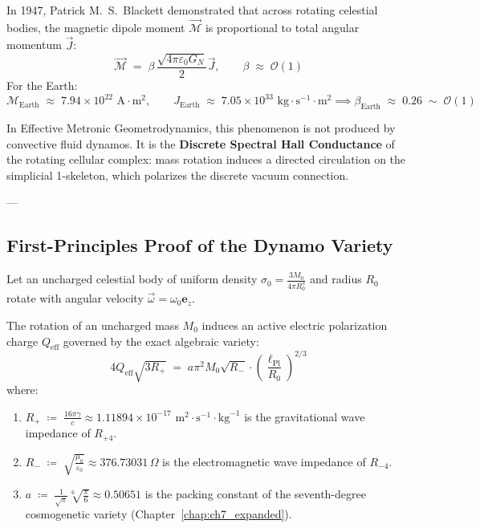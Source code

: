 \documentclass[
    12pt,
    a4paper,
    headings=normal,
    twoside=false,
    open=any,
    parskip=half
]{scrbook}
\begin{document}
In 1947, Patrick M.~S.~Blackett demonstrated that across rotating celestial bodies, the magnetic dipole moment $\vec{\mathcal{M}}$ is proportional to total angular momentum $\vec{J}$:
\begin{equation}
\vec{\mathcal{M}} \;=\; \beta \, \frac{\sqrt{4\pi\varepsilon_0 G_N}}{2} \vec{J}, \qquad \beta \;\approx\; \mathcal{O}(1)
\label{eq:ch6_blackett_empirical_scaling}
\end{equation}
For the Earth:
\begin{equation}
\mathcal{M}_{\text{Earth}} \;\approx\; 7.94 \times 10^{22} \text{ A}\cdot\text{m}^2, \qquad J_{\text{Earth}} \;\approx\; 7.05 \times 10^{33} \text{ kg}\cdot\text{s}^{-1}\cdot\text{m}^2 \implies \beta_{\text{Earth}} \;\approx\; 0.26 \;\sim\; \mathcal{O}(1)
\end{equation}

In Effective Metronic Geometrodynamics, this phenomenon is not produced by convective fluid dynamos. It is the \textbf{Discrete Spectral Hall Conductance} of the rotating cellular complex: mass rotation induces a directed circulation on the simplicial 1-skeleton, which polarizes the discrete vacuum connection.

---

\subsection{First-Principles Proof of the Dynamo Variety}

Let an uncharged celestial body of uniform density $\sigma_0 = \frac{3M_0}{4\pi R_0^3}$ and radius $R_0$ rotate with angular velocity $\vec{\omega} = \omega_0 \mathbf{e}_z$.

\begin{phystheorem}\label{thm:ch6_blackett_heim_master}
The rotation of an uncharged mass $M_0$ induces an active electric polarization charge $Q_{\text{eff}}$ governed by the exact algebraic variety:
\begin{equation}
\boxed{4 Q_{\text{eff}} \sqrt{3 R_+} \;=\; a \pi^2 M_0 \sqrt{R_-} \cdot \left( \frac{\ell_{\text{Pl}}}{R_0} \right)^{2/3}}
\label{eq:ch6_blackett_heim_master_variety}
\end{equation}
where:
\begin{enumerate}[label=(\alph*), noitemsep]
    \item $R_+ \;\coloneqq\; \frac{16\pi\gamma}{c} \approx 1.11894 \times 10^{-17} \text{ m}^2\cdot\text{s}^{-1}\cdot\text{kg}^{-1}$ is the gravitational wave impedance of $R_{+4}$.
    \item $R_- \;\coloneqq\; \sqrt{\frac{\mu_0}{\varepsilon_0}} \approx 376.73031 \, \Omega$ is the electromagnetic wave impedance of $R_{-4}$.
    \item $a \;\coloneqq\; \frac{1}{\sqrt{\pi}}\sqrt[6]{\frac{\pi}{6}} \approx 0.50651$ is the packing constant of the seventh-degree cosmogenetic variety (Chapter~\ref{chap:ch7_expanded}).
\end{enumerate}
\end{phystheorem}
\end{document}
